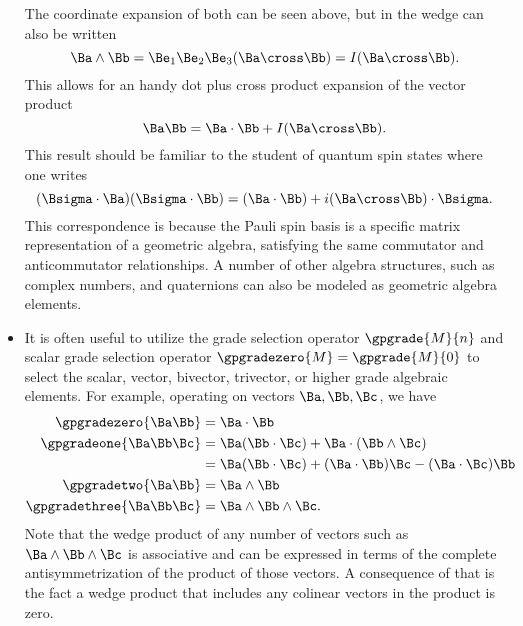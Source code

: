 \begin{itemize}
\begin{equation}
\end{equation}
%
The coordinate expansion of both can be seen above, but in  the wedge can also be written
%
\begin{equation}\label{eqn:gaTutorial:540}
\Ba \wedge \Bb
=
\Be_1 \Be_2 \Be_3
(\Ba \cross \Bb)
=
I
(\Ba \cross \Bb).
\end{equation}
%
This allows for an handy dot plus cross product expansion of the vector product
%
\begin{equation}\label{eqn:gaTutorial:180}
\Ba \Bb = \Ba \cdot \Bb + I (\Ba \cross \Bb).
\end{equation}
%
This result should be familiar to the student of quantum spin states where one writes
%
\begin{equation}\label{eqn:gaTutorial:200}
(\Bsigma \cdot \Ba) (\Bsigma \cdot \Bb) = (\Ba \cdot \Bb) + i (\Ba \cross \Bb) \cdot \Bsigma.
\end{equation}
%
This correspondence is because the Pauli spin basis is a specific matrix representation of a geometric algebra, satisfying the same commutator and anticommutator relationships.  A number of other algebra structures, such as complex numbers, and quaternions can also be modeled as geometric algebra elements.
\item It is often useful to utilize the grade selection operator
\( \gpgrade{M}{n} \) and scalar grade selection operator \( \gpgradezero{M} = \gpgrade{M}{0} \)
to select the scalar, vector, bivector, trivector, or higher grade algebraic elements.  For example, operating on vectors \( \Ba, \Bb, \Bc \), we have
%
\begin{equation}\label{eqn:gaTutorial:580}
\begin{aligned}
\gpgradezero{ \Ba \Bb }
&= \Ba \cdot \Bb \\
\gpgradeone{ \Ba \Bb \Bc }
&=
\Ba (\Bb \cdot \Bc)
+
\Ba \cdot (\Bb \wedge \Bc) \\
&=
\Ba (\Bb \cdot \Bc)
+
(\Ba \cdot \Bb) \Bc
-
(\Ba \cdot \Bc) \Bb \\
\gpgradetwo{\Ba \Bb} &=
\Ba \wedge \Bb \\
\gpgradethree{\Ba \Bb \Bc} &=
\Ba \wedge \Bb \wedge \Bc.
\end{aligned}
\end{equation}
%
Note that the wedge product of any number of vectors such as \( \Ba \wedge \Bb \wedge \Bc \) is associative and can be expressed in terms of the complete antisymmetrization of the product of those vectors.  A consequence of that is the fact a wedge product that includes any colinear vectors in the product is zero.
\end{itemize}

